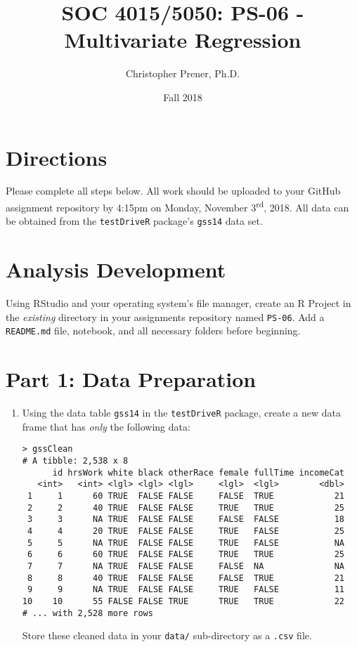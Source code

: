 \documentclass{tufte-handout}
\title{SOC 4015/5050: PS-06 - Multivariate Regression}
\author{Christopher Prener, Ph.D.}
\date{Fall 2018}
\begin{document}

\maketitle %


\vspace{5mm}
\section{Directions}
Please complete all steps below. All work should be uploaded to your GitHub assignment repository by 4:15pm on Monday, November 3\textsuperscript{rd}, 2018. All data can be obtained from the \texttt{testDriveR} package's \texttt{gss14} data set.

\vspace{5mm}
\section{Analysis Development}
Using RStudio and your operating system's file manager, create an R Project in the \textit{existing} directory in your assignments repository named \texttt{PS-06}. Add a \texttt{README.md} file, notebook, and all necessary folders before beginning.

\vspace{5mm}
\section{Part 1: Data Preparation}
\begin{enumerate}
\item Using the data table \texttt{gss14} in the \texttt{testDriveR} package, create a new data frame that has \textit{only} the following data:
\begin{verbatim}
> gssClean
# A tibble: 2,538 x 8
      id hrsWork white black otherRace female fullTime incomeCat
   <int>   <int> <lgl> <lgl> <lgl>     <lgl>  <lgl>        <dbl>
 1     1      60 TRUE  FALSE FALSE     FALSE  TRUE            21
 2     2      40 TRUE  FALSE FALSE     TRUE   TRUE            25
 3     3      NA TRUE  FALSE FALSE     FALSE  FALSE           18
 4     4      20 TRUE  FALSE FALSE     TRUE   FALSE           25
 5     5      NA TRUE  FALSE FALSE     TRUE   FALSE           NA
 6     6      60 TRUE  FALSE FALSE     TRUE   TRUE            25
 7     7      NA TRUE  FALSE FALSE     FALSE  NA              NA
 8     8      40 TRUE  FALSE FALSE     FALSE  TRUE            21
 9     9      NA TRUE  FALSE FALSE     TRUE   FALSE           11
10    10      55 FALSE FALSE TRUE      TRUE   TRUE            22
# ... with 2,528 more rows
\end{verbatim}

Store these cleaned data in your \texttt{data/} sub-directory as a \texttt{.csv} file.
\end{enumerate}
\end{document}

